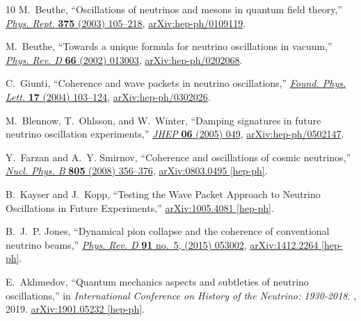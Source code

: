 \documentclass[aps, prd, onecolumn, tightenlines, notitlepage, superscriptaddress, nofootinbib, preprintnumbers, floatfix,showkeys,11pt]{revtex4-2}
\begin{document}
\begin{thebibliography}{10}
M.~Beuthe, ``{Oscillations of neutrinos and mesons in quantum field theory},''
  \href{http://dx.doi.org/10.1016/S0370-1573(02)00538-0}{{\em Phys. Rept.}
  {\bfseries 375} (2003) 105--218},
  \href{http://arxiv.org/abs/hep-ph/0109119}{{\ttfamily arXiv:hep-ph/0109119}}.

M.~Beuthe, ``{Towards a unique formula for neutrino oscillations in vacuum},''
  \href{http://dx.doi.org/10.1103/PhysRevD.66.013003}{{\em Phys. Rev. D}
  {\bfseries 66} (2002) 013003},
  \href{http://arxiv.org/abs/hep-ph/0202068}{{\ttfamily arXiv:hep-ph/0202068}}.

C.~Giunti, ``{Coherence and wave packets in neutrino oscillations},''
  \href{http://dx.doi.org/10.1023/B:FOPL.0000019651.53280.31}{{\em Found. Phys.
  Lett.} {\bfseries 17} (2004) 103--124},
  \href{http://arxiv.org/abs/hep-ph/0302026}{{\ttfamily arXiv:hep-ph/0302026}}.

M.~Blennow, T.~Ohlsson, and W.~Winter, ``{Damping signatures in future neutrino
  oscillation experiments},''
  \href{http://dx.doi.org/10.1088/1126-6708/2005/06/049}{{\em JHEP} {\bfseries
  06} (2005) 049}, \href{http://arxiv.org/abs/hep-ph/0502147}{{\ttfamily
  arXiv:hep-ph/0502147}}.

Y.~Farzan and A.~Y. Smirnov, ``{Coherence and oscillations of cosmic
  neutrinos},'' \href{http://dx.doi.org/10.1016/j.nuclphysb.2008.07.028}{{\em
  Nucl. Phys. B} {\bfseries 805} (2008) 356--376},
  \href{http://arxiv.org/abs/0803.0495}{{\ttfamily arXiv:0803.0495 [hep-ph]}}.

B.~Kayser and J.~Kopp, ``{Testing the Wave Packet Approach to Neutrino
  Oscillations in Future Experiments},''
  \href{http://arxiv.org/abs/1005.4081}{{\ttfamily arXiv:1005.4081 [hep-ph]}}.

B.~J.~P. Jones, ``{Dynamical pion collapse and the coherence of conventional
  neutrino beams},'' \href{http://dx.doi.org/10.1103/PhysRevD.91.053002}{{\em
  Phys. Rev. D} {\bfseries 91} no.~5, (2015) 053002},
  \href{http://arxiv.org/abs/1412.2264}{{\ttfamily arXiv:1412.2264 [hep-ph]}}.

E.~Akhmedov, ``{Quantum mechanics aspects and subtleties of neutrino
  oscillations},'' in {\em {International Conference on History of the
  Neutrino}: {1930-2018}}.
, 2019.
\newblock \href{http://arxiv.org/abs/1901.05232}{{\ttfamily arXiv:1901.05232
  [hep-ph]}}.


\end{thebibliography}
\end{document}
